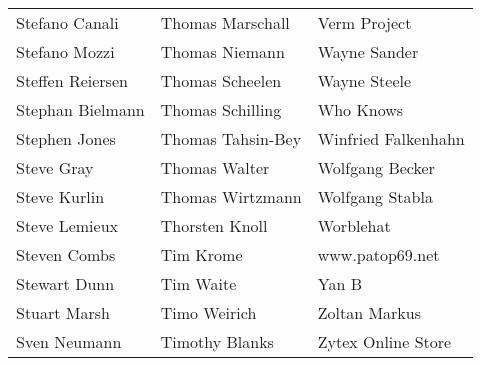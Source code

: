 \begin{tabular}{p{4.5cm}p{4.5cm}p{4.5cm}}
Stefano Canali & Thomas Marschall & Verm Project \\
Stefano Mozzi & Thomas Niemann & Wayne Sander \\
Steffen Reiersen & Thomas Scheelen & Wayne Steele \\
Stephan Bielmann & Thomas Schilling & Who Knows \\
Stephen Jones & Thomas Tahsin-Bey & Winfried Falkenhahn \\
Steve Gray & Thomas Walter & Wolfgang Becker \\
Steve Kurlin & Thomas Wirtzmann & Wolfgang Stabla \\
Steve Lemieux & Thorsten Knoll & Worblehat \\
Steven Combs & Tim Krome & www.patop69.net \\
Stewart Dunn & Tim Waite & Yan B \\
Stuart Marsh & Timo Weirich & Zoltan Markus \\
Sven Neumann & Timothy Blanks & Zytex Online Store \\
\end{tabular}

